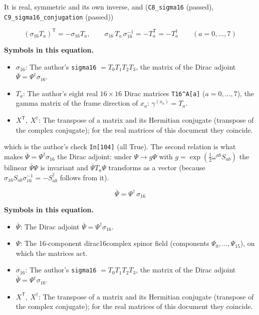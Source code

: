 \documentclass[
  10pt,
]{article}
\providecommand{\tightlist}{%
  \setlength{\itemsep}{0pt}\setlength{\parskip}{0pt}}
\begin{document}
It is real, symmetric and its own inverse, and (\texttt{C8\_sigma16}
(passed), \texttt{C9\_sigma16\_conjugation} (passed))

\[
(\sigma_{16}T_a)^{\mathsf T} = -\sigma_{16}T_a,\qquad \sigma_{16}\,T_a\,\sigma_{16}^{-1} = -T_a^{\mathsf T} = -T_a^\dagger\qquad (a = 0, \dots, 7)
\]

\textbf{Symbols in this equation.}

\begin{itemize}
\tightlist
\item
  \(\sigma_{16}\): The author's \texttt{sigma16} \(= T_0 T_1 T_2 T_3\),
  the matrix of the Dirac adjoint
  \(\bar\Psi = \Psi^\dagger\sigma_{16}\).
\item
  \(T_a\): The author's eight real \(16 \times 16\) Dirac matrices
  \texttt{T16\^{}A{[}a{]}} (\(a = 0, \dots, 7\)), the gamma matrix of
  the frame direction of \(x_a\): \(\gamma^{(x_a)} = T_a\).
\item
  \(X^{\mathsf T},\ X^\dagger\): The transpose of a matrix and its
  Hermitian conjugate (transpose of the complex conjugate); for the real
  matrices of this document they coincide.
\end{itemize}

which is the author's check \texttt{In{[}104{]}} (all True). The second
relation is what makes \(\bar\Psi = \Psi^\dagger\sigma_{16}\) the Dirac
adjoint: under \(\Psi \to g\Psi\) with
\(g = \exp(\tfrac12\omega^{ab}S_{ab})\) the bilinear \(\bar\Psi\Psi\) is
invariant and \(\bar\Psi T_a\Psi\) transforms as a vector (because
\(\sigma_{16}S_{ab}\sigma_{16}^{-1} = -S_{ab}^\dagger\) follows from
it).

\[
\bar\Psi = \Psi^\dagger\,\sigma_{16}
\]

\textbf{Symbols in this equation.}

\begin{itemize}
\tightlist
\item
  \(\bar\Psi\): The Dirac adjoint
  \(\bar\Psi = \Psi^\dagger\sigma_{16}\).
\item
  \(\Psi\): The 16-component dirac16complex spinor field (components
  \(\Psi_0, \dots, \Psi_{15}\)), on which the matrices act.
\item
  \(\sigma_{16}\): The author's \texttt{sigma16} \(= T_0 T_1 T_2 T_3\),
  the matrix of the Dirac adjoint
  \(\bar\Psi = \Psi^\dagger\sigma_{16}\).
\item
  \(X^{\mathsf T},\ X^\dagger\): The transpose of a matrix and its
  Hermitian conjugate (transpose of the complex conjugate); for the real
  matrices of this document they coincide.
\end{itemize}
\end{document}
